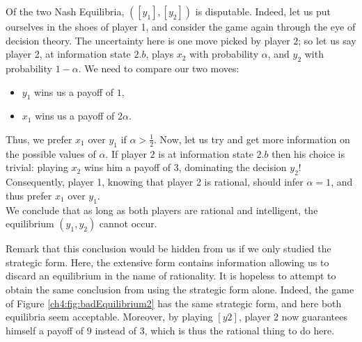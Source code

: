 \begin{example}
Of the two Nash Equilibria, $([y_1], [y_2])$ is disputable. 
Indeed, let us put ourselves in the shoes of player 1, and consider the game again through the eye of decision theory. The uncertainty here is one move picked by player $2$; so let us say player 2, at information state $2.b$, plays $x_2$ with probability $\alpha$, and $y_2$ with probability $1-\alpha$. 
We need to compare our two moves:
\begin{itemize}
\item $y_1$ wins us a payoff of $1$,
\item $x_1$ wins us a payoff of $2 \alpha$.
\end{itemize}
Thus, we prefer $x_1$ over $y_1$ if $\alpha > \frac{1}{2}$. 
Now, let us try and get more information on the possible values of $\alpha$. If player $2$ is at information state $2.b$ then his choice is trivial: playing $x_2$ wins him a payoff of $3$, dominating the decision $y_2$! Consequently, player 1,  knowing that player 2 is rational, should infer $\alpha = 1$, and thus prefer $x_1$ over $y_1$. \\
We conclude that as long as both players are rational and intelligent, the equilibrium $(y_1, y_2)$ cannot occur.

Remark that this conclusion would be hidden from us if we only studied the strategic form. Here, the extensive form contains information allowing us to discard an equilibrium in the name of rationality. 
It is hopeless to attempt to obtain the same conclusion from using the strategic form alone. Indeed, the game of Figure \ref{ch4:fig:badEquilibrium2} has the same strategic form, and here both equilibria seem acceptable. Moreover, by playing $[y2]$, player 2 now guarantees himself a payoff of $9$ instead of $3$, which is thus the rational thing to do here. 
\begin{figure}[!ht]
\begin{center}
\end{center}
\end{figure}
\end{example}
